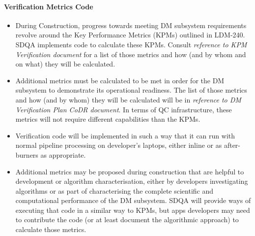 \paragraph{Verification Metrics Code}
\label{sec:qaVerify}
\begin{itemize}

\item During Construction, progress towards meeting DM subsystem requirements revolve around the Key Performance Metrics (KPMs) outlined in LDM-240. SDQA implements code to calculate these KPMs. Consult \emph{reference to KPM Verification document} for a list of those metrics and how (and by whom and on what) they will be calculated.

\item Additional metrics must be calculated to be met in order for the DM subsystem to demonstrate its operational readiness. The list of those metrics and how (and by whom) they will be calculated will be in \emph{reference to DM Verification Plan CoDR document}. In terms of QC infrastructure, these metrics will not require different capabilities than the KPMs.

\item Verification code will be implemented in such a way that it can run with normal pipeline processing on developer's laptops, either inline or as after-burners as appropriate.

\item Additional metrics may be proposed during construction that are helpful to development or algorithm characterisation, either by developers investigating algorithms or as part of characterising the complete scientific and computational performance of the DM subsystem. SDQA will provide ways of executing that code in a similar way to KPMs, but apps developers may need to contribute the code (or at least document the algorithmic approach) to calculate those metrics.

\end{itemize}

